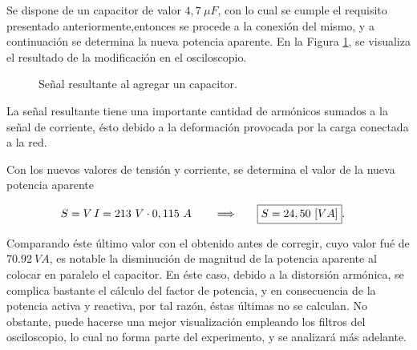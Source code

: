           Se dispone de un capacitor de valor $4,7~\mu F$, con lo cual se cumple el requisito presentado
          anteriormente,entonces se procede a la conexión del mismo, y a continuación se determina la nueva potencia aparente. 
          En la Figura \ref{fig: Señal_Correccion}, se visualiza el resultado de la modificación en el osciloscopio.
        
        \begin{figure}[H]
          \centering
          \caption{Señal resultante al agregar un capacitor.}
          \label{fig: Señal_Correccion}
        \end{figure}

        La señal resultante tiene una importante cantidad de armónicos sumados a la señal de corriente, ésto debido
        a la deformación provocada por la carga conectada a la red.

         Con los nuevos valores de tensión y corriente, se determina el valor de la nueva potencia 
         aparente

        \begin{align*}
          S = V\,I  = 213~V \cdot 0,115\ A \hspace{20pt} \Longrightarrow \hspace{20pt} \Aboxed{S = 24,50 ~[VA]}.
        \end{align*}

        Comparando éste último valor con el obtenido antes de corregir, 
        cuyo valor fué de $70.92~VA$, es notable la disminución de magnitud 
        de la potencia aparente al colocar en paralelo el capacitor.
        En éste caso, debido a la distorsión armónica, se complica bastante el 
        cálculo del factor de potencia, y en consecuencia de la potencia 
        activa y reactiva, por tal razón, éstas últimas no se calculan. No obstante, puede hacerse una mejor visualización 
        empleando los filtros del osciloscopio, lo cual no forma parte del 
        experimento, y se analizará más adelante.



